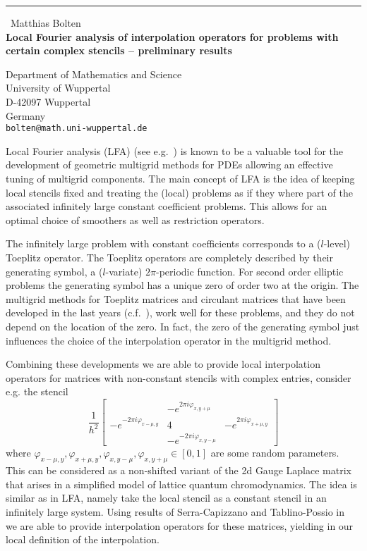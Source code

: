 \documentclass{report}
\begin{document}
\begin{center}
\rule{6in}{1pt} \
{\large Matthias Bolten \\
{\bf Local Fourier analysis of interpolation operators for problems with certain complex stencils -- preliminary results}}

Department of Mathematics and Science \\ University of Wuppertal \\ D-42097 Wuppertal \\ Germany
\\
{\tt bolten@math.uni-wuppertal.de}\end{center}

Local Fourier analysis (LFA) (see e.g.~\cite{art:BRAN77,boo:TROT01}) is
known to be a valuable tool for the development of geometric multigrid
methods for PDEs allowing an effective tuning of multigrid components.
The main concept of LFA is the idea of keeping local stencils fixed and
treating the (local) problems as if they where part of the associated
infinitely large constant coefficient problems. This allows for an
optimal choice of smoothers as well as restriction operators.

The infinitely large problem with constant coefficients corresponds to a
($l$-level) Toeplitz operator. The Toeplitz operators are completely
described by their generating symbol, a ($l$-variate) $2 \pi$-periodic
function. For second order elliptic problems the generating symbol has a
unique zero of order two at the origin. The multigrid methods for
Toeplitz matrices and circulant matrices that have been developed in the
last years (c.f.~\cite{art:FIOR96,art:FIOR96a,art:SERR02,art:SERR04}),
work well for these problems, and they do not depend on the location of
the zero. In fact, the zero of the generating symbol just influences the
choice of the interpolation operator in the multigrid method.

Combining these developments we are able to provide local interpolation
operators for matrices with non-constant stencils with complex entries,
consider e.g. the stencil
\begin{equation*}
\frac{1}{h^{2}} \left[ \begin{array}{ccc}
& -e^{2 \pi i \varphi_{x,y+\mu}} & \\
-e^{-2 \pi i \varphi_{x-\mu,y}} & 4 & -e^{2 \pi i \varphi_{x+\mu,y}} \\
& -e^{-2 \pi i \varphi_{x,y-\mu}} &
\end{array} \right]
\end{equation*}
where $\varphi_{x-\mu,y}, \varphi_{x+\mu,y}, \varphi_{x,y-\mu},
\varphi_{x,y+\mu} \in [0,1]$ are some random parameters. This can be
considered as a non-shifted variant of the 2d Gauge Laplace matrix that
arises in a simplified model of lattice quantum chromodynamics. The idea
is similar as in LFA, namely take the local stencil as a constant stencil
in an infinitely large system. Using results of Serra-Capizzano and
Tablino-Possio in~\cite{art:SERR04} we are able to provide interpolation
operators for these matrices, yielding in our local definition of the
interpolation.
\end{document}
